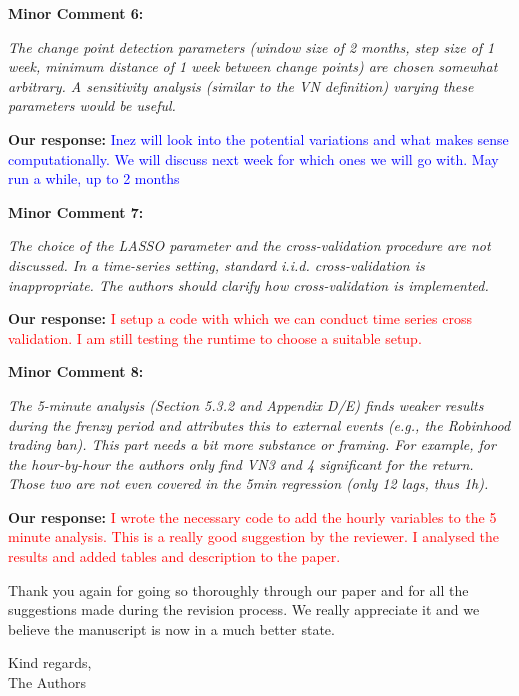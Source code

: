 \documentclass[11pt]{article}
\newcommand{\reviewercomment}[1]{\begin{commentbox}\textit{#1}\end{commentbox}}
\newcommand{\ourresponse}[1]{\textbf{Our response:} #1}
\begin{document}
\bigskip

\textbf{Minor Comment 6:}

\reviewercomment{%
	The change point detection parameters (window size of 2 months, step size of 1 week, minimum distance of 1 week between change points) are chosen somewhat arbitrary. A sensitivity analysis (similar to the VN definition) varying these parameters would be useful. 
}

\ourresponse{
	\textcolor{blue}{Inez will look into the potential variations and what makes sense computationally. We will discuss next week for which ones we will go with. May run a while, up to 2 months}
}

\bigskip

\textbf{Minor Comment 7:}

\reviewercomment{%
	The choice of the LASSO parameter and the cross-validation procedure are not discussed. In a time-series setting, standard i.i.d. cross-validation is inappropriate. The authors should clarify how cross-validation is implemented. 
}

\ourresponse{
	\textcolor{red}{I setup a code with which we can conduct time series cross validation. I am still testing the runtime to choose a suitable setup. }
}

\bigskip

\textbf{Minor Comment 8:}

\reviewercomment{%
	The 5-minute analysis (Section 5.3.2 and Appendix D/E) finds weaker results during the frenzy period and attributes this to external events (e.g., the Robinhood trading ban). This part needs a bit more substance or framing. For example, for the hour-by-hour the authors only find VN3 and 4 significant for the return. Those two are not even covered in the 5min regression (only 12 lags, thus 1h). 
}

\ourresponse{
	\textcolor{red}{I wrote the necessary code to add the hourly variables to the 5 minute analysis. This is a really good suggestion by the reviewer. I analysed the results and added tables and description to the paper.}
}

\bigskip\bigskip

Thank you again for going so thoroughly through our paper and for all the suggestions made during the revision process. We really appreciate it and we believe the manuscript is now in a much better state. 

\bigskip
Kind regards,\\
The Authors
\end{document}
